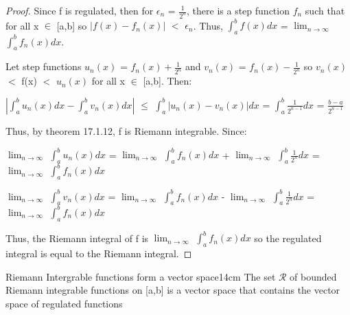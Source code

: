    \begin{proof}
        Since f is regulated, then for $\epsilon_n$ = $\frac{1}{2^n}$, there is
        a step function $f_n$ such that for all x $\in$ [a,b] so
        $|f(x) - f_n(x)|$ $<$ $\epsilon_n$.
        Thus, $\int_a^b f(x) dx$
        = $\lim_{n \rightarrow \infty}$ $\int_a^b f_n(x) dx$.

        Let step functions $u_n(x)$ = $f_n(x) + \frac{1}{2^n}$
        and $v_n(x)$ = $f_n(x) - \frac{1}{2^n}$
        so $v_n(x)$ $<$ f(x) $<$ $u_n(x)$ for all x $\in$ [a,b].
        Then:

        \hspace{0.5cm}
        $|\int_a^b u_n(x) dx - \int_a^b v_n(x) dx|$
        $\leq$ $\int_a^b |u_n(x) - v_n(x)| dx$
        = $\int_a^b \frac{1}{2^{n-1}} dx$
        = $\frac{b-a}{2^{n-1}}$

        Thus, by {\color{red} theorem 17.1.12}, f is Riemann integrable. Since:

        \hspace{0.5cm}
        $\lim_{n \rightarrow \infty}$ $\int_a^b u_n(x) dx$
        = $\lim_{n \rightarrow \infty}$ $\int_a^b f_n(x) dx$
            + $\lim_{n \rightarrow \infty}$ $\int_a^b \frac{1}{2^n} dx$
        = $\lim_{n \rightarrow \infty}$ $\int_a^b f_n(x) dx$

        \hspace{0.5cm}
        $\lim_{n \rightarrow \infty}$ $\int_a^b v_n(x) dx$
        = $\lim_{n \rightarrow \infty}$ $\int_a^b f_n(x) dx$
            - $\lim_{n \rightarrow \infty}$ $\int_a^b \frac{1}{2^n} dx$
        = $\lim_{n \rightarrow \infty}$ $\int_a^b f_n(x) dx$

        Thus, the Riemann integral of f is
        $\lim_{n \rightarrow \infty}$ $\int_a^b f_n(x) dx$
        so the regulated integral is equal to the Riemann integral.
    \end{proof}

    \vspace{0.5cm}



    \begin{wtheorem}{Riemann Intergrable functions form a vector space}{14cm}
        The set $\mathcal{R}$ of bounded Riemann integrable functions on [a,b] is
        a vector space that contains the vector space of regulated
        functions 
    \end{wtheorem}


